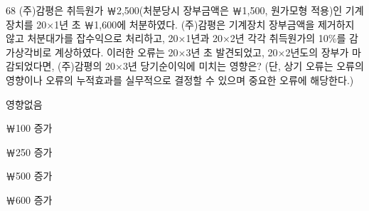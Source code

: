 \begin{question}{68}
(주)감평은 취득원가 ￦2,500(처분당시 장부금액은 ￦1,500, 원가모형 적용)인 기계장치를 20×1년 초 ￦1,600에 처분하였다. (주)감평은 기계장치 장부금액을 제거하지 않고 처분대가를 잡수익으로 처리하고, 20×1년과 20×2년 각각 취득원가의 10\%를 감가상각비로 계상하였다. 이러한 오류는 20×3년 초 발견되었고, 20×2년도의 장부가 마감되었다면, (주)감평의 20×3년 당기순이익에 미치는 영향은? (단, 상기 오류는 오류의 영향이나 오류의 누적효과를 실무적으로 결정할 수 있으며 중요한 오류에 해당한다.)
\begin{choices}
  \item 영향없음
  \item ￦100 증가
  \item ￦250 증가
  \item ￦500 증가
  \item ￦600 증가
\end{choices}
\end{question}
